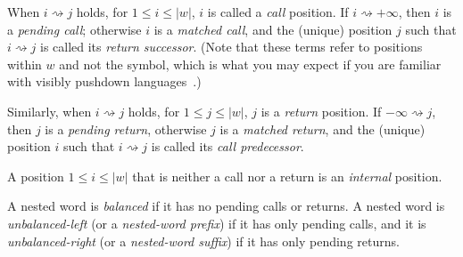 When $i \rightsquigarrow j$ holds, for $1 \leq i \leq |w|$, $i$ is called a
\emph{call} position. If $i \rightsquigarrow +\infty$, then $i$ is a
\emph{pending call}; otherwise $i$ is a \emph{matched call}, and the
(unique) position $j$ such that $i \rightsquigarrow j$ is called its
\emph{return successor}. (Note that these terms refer to positions within
$w$ and not the symbol, which is what you may expect if you are familiar with
visibly pushdown languages~\cite{JACM:AM2009}.)

Similarly, when $i \rightsquigarrow j$ holds, for $1 \leq j \leq |w|$, $j$
is a \emph{return} position. If $-\infty \rightsquigarrow j$, then $j$ is
a \emph{pending return}, otherwise $j$ is a \emph{matched return}, and
the (unique) position $i$ such that $i \rightsquigarrow j$ is called its
\emph{call predecessor}.

A position $1 \leq i \leq |w|$ that is neither a call nor a return is an
\emph{internal} position.

A nested word is \emph{balanced} if it has no pending calls
or returns.  A nested word is \emph{unbalanced-left} (or a
\emph{nested-word prefix}) if it has only pending calls, and it is
\emph{unbalanced-right} (or a \emph{nested-word suffix})
if it has only pending returns.



